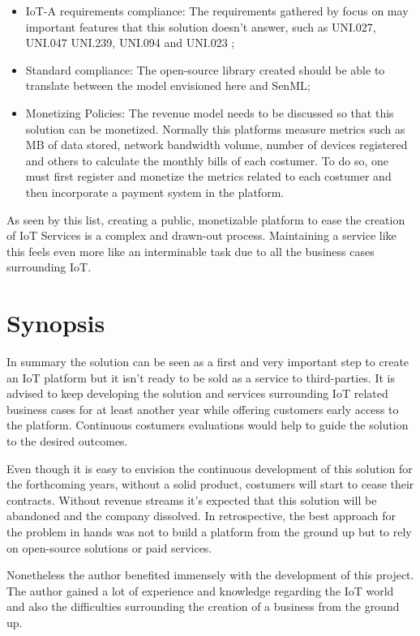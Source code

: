 \begin{itemize}
    \item IoT-A requirements compliance: The requirements gathered by \cite{iot-a} focus on may important features that this solution doesn't answer, such as UNI.027, UNI.047 UNI.239, UNI.094 and UNI.023 \parencite{iot-a};
    \item {} Standard compliance: The open-source library created should be able to translate between the model envisioned here and SenML;
    \item Monetizing Policies: The revenue model needs to be discussed so that this solution can be monetized. Normally this platforms measure metrics such as MB of data stored, network bandwidth volume, number of devices registered and others to calculate the monthly bills of each costumer. To do so, one must first register and monetize the metrics related to each costumer and then incorporate a payment system in the platform.
\end{itemize}

As seen by this list, creating a public, monetizable platform to ease the creation of \gls{IoT} Services is a complex and drawn-out process. Maintaining a service like this feels even more like an interminable task due to all the business cases surrounding \gls{IoT}.

\section{Synopsis}
\label{sec:conclusion:synopsis}

In summary the solution can be seen as a first and very important step to create an \gls{IoT} platform but it isn't ready to be sold as a service to third-parties. It is advised to keep developing the solution and services surrounding \gls{IoT} related business cases for at least another year while offering customers early access to the platform. Continuous costumers evaluations would help to guide the solution to the desired outcomes.

Even though it is easy to envision the continuous development of this solution for the forthcoming years, without a solid product, costumers will start to cease their contracts. Without revenue streams it's expected that this solution will be abandoned and the company dissolved. In retrospective, the best approach for the problem in hands was not to build a platform from the ground up but to rely on open-source solutions or paid services.

Nonetheless the author benefited immensely with the development of this project. The author gained a lot of experience and knowledge regarding the \gls{IoT} world and also the difficulties surrounding the creation of a business from the ground up.
